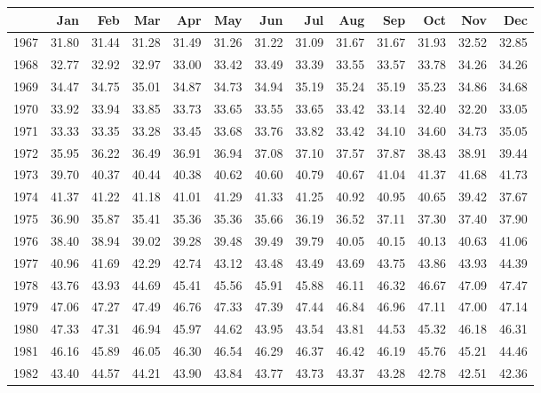 \begin{longtable}{rrrrrrrrrrrrr}
  \hline
 & Jan & Feb & Mar & Apr & May & Jun & Jul & Aug & Sep & Oct & Nov & Dec \\ 
  \hline
1967 & 31.80 & 31.44 & 31.28 & 31.49 & 31.26 & 31.22 & 31.09 & 31.67 & 31.67 & 31.93 & 32.52 & 32.85 \\ 
  1968 & 32.77 & 32.92 & 32.97 & 33.00 & 33.42 & 33.49 & 33.39 & 33.55 & 33.57 & 33.78 & 34.26 & 34.26 \\ 
  1969 & 34.47 & 34.75 & 35.01 & 34.87 & 34.73 & 34.94 & 35.19 & 35.24 & 35.19 & 35.23 & 34.86 & 34.68 \\ 
  1970 & 33.92 & 33.94 & 33.85 & 33.73 & 33.65 & 33.55 & 33.65 & 33.42 & 33.14 & 32.40 & 32.20 & 33.05 \\ 
  1971 & 33.33 & 33.35 & 33.28 & 33.45 & 33.68 & 33.76 & 33.82 & 33.42 & 34.10 & 34.60 & 34.73 & 35.05 \\ 
  1972 & 35.95 & 36.22 & 36.49 & 36.91 & 36.94 & 37.08 & 37.10 & 37.57 & 37.87 & 38.43 & 38.91 & 39.44 \\ 
  1973 & 39.70 & 40.37 & 40.44 & 40.38 & 40.62 & 40.60 & 40.79 & 40.67 & 41.04 & 41.37 & 41.68 & 41.73 \\ 
  1974 & 41.37 & 41.22 & 41.18 & 41.01 & 41.29 & 41.33 & 41.25 & 40.92 & 40.95 & 40.65 & 39.42 & 37.67 \\ 
  1975 & 36.90 & 35.87 & 35.41 & 35.36 & 35.36 & 35.66 & 36.19 & 36.52 & 37.11 & 37.30 & 37.40 & 37.90 \\ 
  1976 & 38.40 & 38.94 & 39.02 & 39.28 & 39.48 & 39.49 & 39.79 & 40.05 & 40.15 & 40.13 & 40.63 & 41.06 \\ 
  1977 & 40.96 & 41.69 & 42.29 & 42.74 & 43.12 & 43.48 & 43.49 & 43.69 & 43.75 & 43.86 & 43.93 & 44.39 \\ 
  1978 & 43.76 & 43.93 & 44.69 & 45.41 & 45.56 & 45.91 & 45.88 & 46.11 & 46.32 & 46.67 & 47.09 & 47.47 \\ 
  1979 & 47.06 & 47.27 & 47.49 & 46.76 & 47.33 & 47.39 & 47.44 & 46.84 & 46.96 & 47.11 & 47.00 & 47.14 \\ 
  1980 & 47.33 & 47.31 & 46.94 & 45.97 & 44.62 & 43.95 & 43.54 & 43.81 & 44.53 & 45.32 & 46.18 & 46.31 \\ 
  1981 & 46.16 & 45.89 & 46.05 & 46.30 & 46.54 & 46.29 & 46.37 & 46.42 & 46.19 & 45.76 & 45.21 & 44.46 \\ 
  1982 & 43.40 & 44.57 & 44.21 & 43.90 & 43.84 & 43.77 & 43.73 & 43.37 & 43.28 & 42.78 & 42.51 & 42.36 \\ 

\end{longtable}
